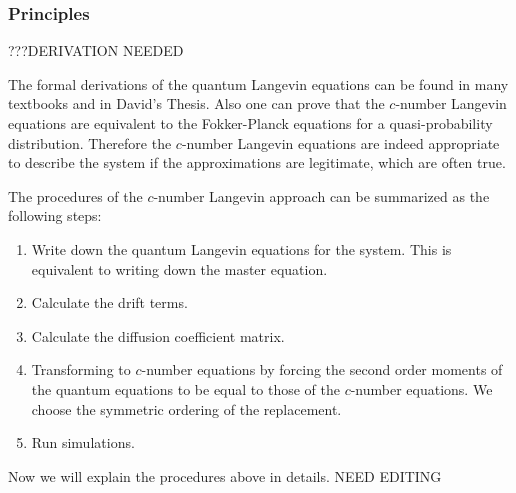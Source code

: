 \documentclass{article}
\begin{document}
\subsubsection{Principles}
???DERIVATION NEEDED

The formal derivations of the quantum Langevin equations can be found in many textbooks and in David's Thesis. Also one can prove that the $c$-number Langevin equations are equivalent to the Fokker-Planck equations for a quasi-probability distribution. Therefore the $c$-number Langevin equations are indeed appropriate to describe the system if the approximations are legitimate, which are often true.

The procedures of the $c$-number Langevin approach can be summarized as the following steps:
\begin{enumerate}
    \item Write down the quantum Langevin equations for the system. This is equivalent to writing down the master equation.
    \item Calculate the drift terms.
    \item Calculate the diffusion coefficient matrix.
    \item Transforming to $c$-number equations by forcing the second order moments of the quantum equations to be equal to those of the $c$-number equations. We choose the symmetric ordering of the replacement.
    \item Run simulations.
\end{enumerate}

Now we will explain the procedures above in details. NEED EDITING
\end{document}
